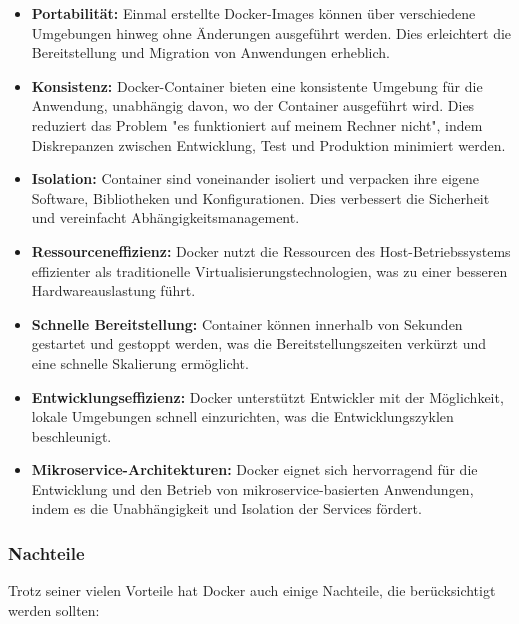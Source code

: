 \begin{itemize}
    \item \textbf{Portabilität:} Einmal erstellte Docker-Images können über verschiedene Umgebungen hinweg ohne Änderungen ausgeführt werden. Dies erleichtert die Bereitstellung und Migration von Anwendungen erheblich.
    \item \textbf{Konsistenz:} Docker-Container bieten eine konsistente Umgebung für die Anwendung, unabhängig davon, wo der Container ausgeführt wird. Dies reduziert das Problem "es funktioniert auf meinem Rechner nicht", indem Diskrepanzen zwischen Entwicklung, Test und Produktion minimiert werden.
    \item \textbf{Isolation:} Container sind voneinander isoliert und verpacken ihre eigene Software, Bibliotheken und Konfigurationen. Dies verbessert die Sicherheit und vereinfacht Abhängigkeitsmanagement.
    \item \textbf{Ressourceneffizienz:} Docker nutzt die Ressourcen des Host-Betriebssystems effizienter als traditionelle Virtualisierungstechnologien, was zu einer besseren Hardwareauslastung führt.
    \item \textbf{Schnelle Bereitstellung:} Container können innerhalb von Sekunden gestartet und gestoppt werden, was die Bereitstellungszeiten verkürzt und eine schnelle Skalierung ermöglicht.
    \item \textbf{Entwicklungseffizienz:} Docker unterstützt Entwickler mit der Möglichkeit, lokale Umgebungen schnell einzurichten, was die Entwicklungszyklen beschleunigt.
    \item \textbf{Mikroservice-Architekturen:} Docker eignet sich hervorragend für die Entwicklung und den Betrieb von mikroservice-basierten Anwendungen, indem es die Unabhängigkeit und Isolation der Services fördert.
\end{itemize}

\subsubsection{Nachteile}

Trotz seiner vielen Vorteile hat Docker auch einige Nachteile, die berücksichtigt werden sollten:


